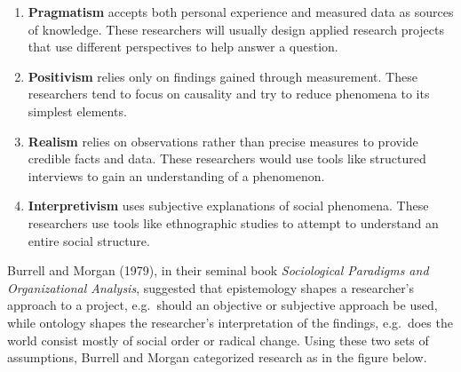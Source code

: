\documentclass[]{book}
\theoremstyle{definition}
\theoremstyle{definition}
\theoremstyle{definition}
\theoremstyle{remark}
\begin{document}
\begin{enumerate}
\def\labelenumi{\arabic{enumi}.}
\item
  \textbf{Pragmatism} accepts both personal experience and measured data
  as sources of knowledge. These researchers will usually design applied
  research projects that use different perspectives to help answer a
  question.
\item
  \textbf{Positivism} relies only on findings gained through
  measurement. These researchers tend to focus on causality and try to
  reduce phenomena to its simplest elements.
\item
  \textbf{Realism} relies on observations rather than precise measures
  to provide credible facts and data. These researchers would use tools
  like structured interviews to gain an understanding of a phenomenon.
\item
  \textbf{Interpretivism} uses subjective explanations of social
  phenomena. These researchers use tools like ethnographic studies to
  attempt to understand an entire social structure.
\end{enumerate}

Burrell and Morgan (1979), in their seminal book \emph{Sociological
Paradigms and Organizational Analysis}, suggested that epistemology
shapes a researcher's approach to a project, e.g.~should an objective or
subjective approach be used, while ontology shapes the researcher's
interpretation of the findings, e.g.~does the world consist mostly of
social order or radical change. Using these two sets of assumptions,
Burrell and Morgan categorized research as in the figure below.
\end{document}
